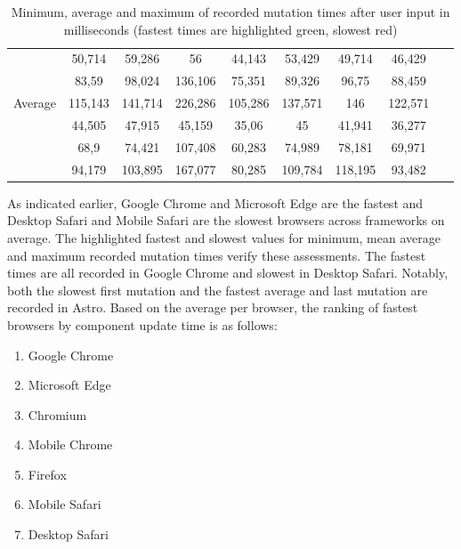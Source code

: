 \documentclass[a4paper, 12pt]{article}
\begin{document}
\begin{table}[!h]
\begin{adjustbox}{angle=90}
{\begin{tabular}{|l|c|c|c|c|c|c|c|r|}
                 \hline
                                                     & 50,714  & 59,286                    & 56                        & 44,143                  & 53,429  & 49,714  & 46,429  & ~       \\
                                                     & 83,59   & 98,024                    & 136,106                   & 75,351                  & 89,326  & 96,75   & 88,459  & ~       \\
                 \multirow{-3}{*}{Average}           & 115,143 & 141,714                   & 226,286                   & 105,286                 & 137,571 & 146     & 122,571 & ~       \\ \hline
\rowcolor{white}                                     & 44,505  & 47,915                    & 45,159                    & 35,06                   & 45      & 41,941  & 36,277  & ~       \\
\rowcolor{white}                                     & 68,9    & 74,421                    & 107,408                   & 60,283                  & 74,989  & 78,181  & 69,971  & ~       \\
\rowcolor{white} \multirow{-3}{*}{Weighted average}  & 94,179  & 103,895                   & 167,077                   & 80,285                  & 109,784 & 118,195 & 93,482  & ~       \\ \hline
      \end{tabular}
    }
  \end{adjustbox}
  \caption{Minimum, average and maximum of recorded mutation times after user input in milliseconds (fastest times are highlighted green, slowest red)}
  \label{tab:mutations:times}
\end{table}

\pagebreak

As indicated earlier, Google Chrome and Microsoft Edge are the fastest and Desktop Safari and Mobile Safari are the slowest browsers across frameworks on average.
The highlighted fastest and slowest values for minimum, mean average and maximum recorded mutation times verify these assessments.
The fastest times are all recorded in Google Chrome and slowest in Desktop Safari.
Notably, both the slowest first mutation and the fastest average and last mutation are recorded in Astro.
Based on the average per browser, the ranking of fastest browsers by component update time is as follows:

\begin{enumerate}
  \item Google Chrome
  \item Microsoft Edge
  \item Chromium
  \item Mobile Chrome
  \item Firefox
  \item Mobile Safari
  \item Desktop Safari
\end{enumerate}
\end{document}
